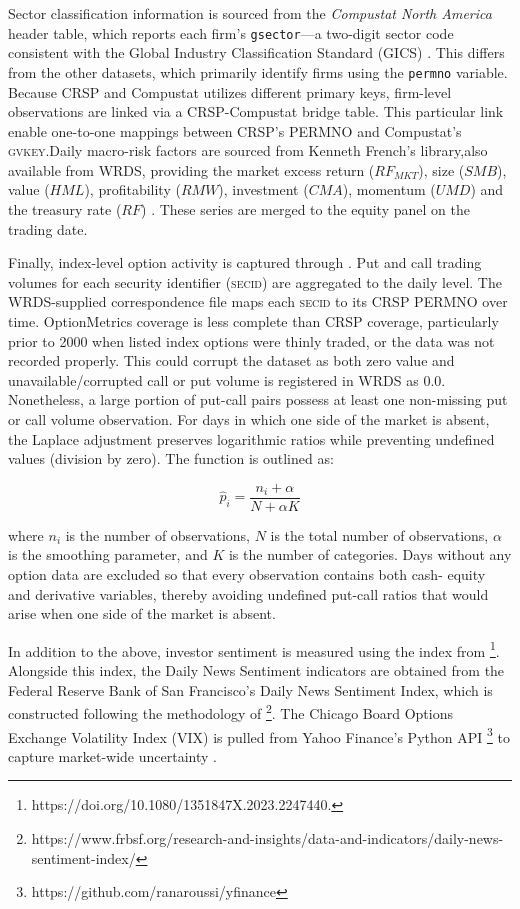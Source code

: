 Sector classification information is sourced from the \emph{Compustat North America} header table, which reports each firm's \texttt{gsector}—a two-digit sector code consistent with the Global Industry Classification Standard (GICS) \cite{compstat}. This differs from the other datasets, which primarily identify firms using the \texttt{permno} variable. Because CRSP and Compustat utilizes different primary keys, firm-level observations are linked via a CRSP-Compustat bridge table. This particular link enable one-to-one mappings between CRSP's PERMNO and Compustat's \textsc{gvkey}.Daily macro-risk factors are sourced from Kenneth French's library,also available from WRDS, providing the market excess return ($RF_{MKT}$), size ($SMB$), value ($HML$), profitability ($RMW$), investment ($CMA$), momentum ($UMD$) and the treasury rate ($RF$) \cite{ff_wrds}. These series are merged to the equity panel on the trading date.

Finally, index-level option activity is captured through . Put and call trading volumes for each security identifier (\textsc{secid}) are aggregated to the daily level. The WRDS-supplied correspondence file maps each \textsc{secid} to its CRSP PERMNO over time. OptionMetrics coverage is less complete than CRSP coverage, particularly prior to 2000 when listed index options were thinly traded, or the data was not recorded properly. This could corrupt the dataset as both zero value and unavailable/corrupted call or put volume is registered in WRDS as 0.0. Nonetheless, a large portion of put-call pairs possess at least one non-missing put or call volume observation. For days in which one side of the market is absent, the Laplace adjustment preserves logarithmic ratios while preventing undefined values (division by zero). The function is outlined as:

\begin{equation}
     \hat{p}_i = \frac{n_i + \alpha}{N + \alpha K}
     \end{equation}

where $n_i$ is the number of observations, $N$ is the total number of observations, $\alpha$ is the smoothing parameter, and $K$ is the number of categories. Days without any option data are excluded so that every observation contains both cash- equity and derivative variables, thereby avoiding undefined put-call ratios that would arise when one side of the market is absent.

In addition to the above, investor sentiment is measured using the index from \footnote{https://doi.org/10.1080/1351847X.2023.2247440.}. Alongside this index, the Daily News Sentiment indicators are obtained from the Federal Reserve Bank of San Francisco's Daily News Sentiment Index, which is constructed following the methodology of  \footnote{https://www.frbsf.org/research-and-insights/data-and-indicators/daily-news-sentiment-index/}. The Chicago Board Options Exchange Volatility Index (VIX) is pulled from Yahoo Finance's Python API \footnote{https://github.com/ranaroussi/yfinance} to capture market-wide uncertainty \cite{vix_cboe}. 
 

